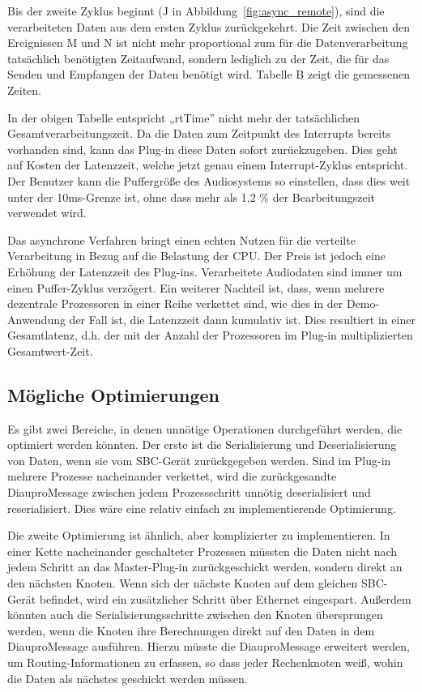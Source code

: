 Bis der zweite Zyklus beginnt (J in Abbildung~\ref{fig:async_remote}), sind die verarbeiteten Daten aus dem ersten Zyklus zurückgekehrt. Die Zeit zwischen den Ereignissen M und N ist nicht mehr proportional zum für die Datenverarbeitung tatsächlich benötigten Zeitaufwand, sondern lediglich zu der Zeit, die für das Senden und Empfangen der Daten benötigt wird. Tabelle B zeigt die gemessenen Zeiten.



In der obigen Tabelle entspricht „rtTime” nicht mehr der tatsächlichen Gesamtverarbeitungszeit. Da die Daten zum Zeitpunkt des Interrupts bereits vorhanden sind, kann das Plug-in diese Daten sofort zurückzugeben. Dies geht auf Kosten der Latenzzeit, welche jetzt genau einem Interrupt-Zyklus entspricht. Der Benutzer kann die Puffergröße des Audiosystems so einstellen, dass dies weit unter der 10ms-Grenze ist, ohne dass mehr als 1,2 \% der Bearbeitungszeit verwendet wird.

Das asynchrone Verfahren bringt einen echten Nutzen für die verteilte Verarbeitung in Bezug auf die Belastung der CPU. Der Preis ist jedoch eine Erhöhung der Latenzzeit des Plug-ins. Verarbeitete Audiodaten sind immer um einen Puffer-Zyklus verzögert. Ein weiterer Nachteil ist, dass, wenn mehrere dezentrale Prozessoren in einer Reihe verkettet sind, wie dies in der Demo-Anwendung der Fall ist, die Latenzzeit dann kumulativ ist. Dies resultiert in einer Gesamtlatenz, d.h. der mit der Anzahl der Prozessoren im Plug-in multiplizierten Gesamtwert-Zeit.

\subsection{Mögliche Optimierungen}

Es gibt zwei Bereiche, in denen unnötige Operationen durchgeführt werden, die optimiert werden könnten. Der erste ist die Serialisierung und Deserialisierung von Daten, wenn sie vom SBC-Gerät zurückgegeben werden. Sind im Plug-in mehrere Prozesse nacheinander verkettet, wird die zurückgesandte DiauproMessage zwischen jedem Prozessschritt unnötig deserialisiert und reserialisiert. Dies wäre eine relativ einfach zu implementierende Optimierung.

Die zweite Optimierung ist ähnlich, aber komplizierter zu implementieren. In einer Kette nacheinander geschalteter Prozessen müssten die Daten nicht nach jedem Schritt an das Master-Plug-in zurückgeschickt werden, sondern direkt an den nächsten Knoten. Wenn sich der nächste Knoten auf dem gleichen SBC-Gerät befindet, wird ein zusätzlicher Schritt über Ethernet eingespart. Außerdem könnten auch die Serialisierungsschritte zwischen den Knoten übersprungen werden, wenn die Knoten ihre Berechnungen direkt auf den Daten in dem DiauproMessage ausführen. Hierzu müsste die DiauproMessage erweitert werden, um Routing-Informationen zu erfassen, so dass jeder Rechenknoten weiß, wohin die Daten als nächstes geschickt werden müssen.

